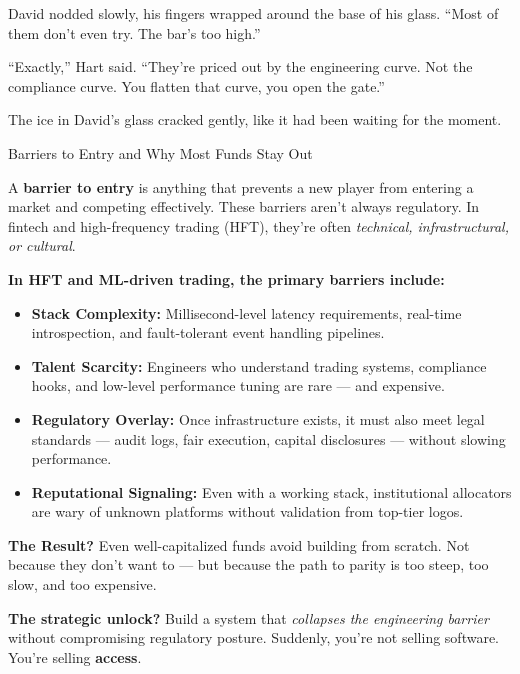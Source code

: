 David nodded slowly, his fingers wrapped around the base of his glass. “Most of them don’t even try. The bar’s too high.”

“Exactly,” Hart said. “They’re priced out by the engineering curve. Not the compliance curve. You flatten that curve, you 
open the gate.”

The ice in David’s glass cracked gently, like it had been waiting for the moment.


\medskip

\begin{TechnicalSidebar}{Barriers to Entry and Why Most Funds Stay Out}

  A \textbf{barrier to entry} is anything that prevents a new player from entering a market and competing effectively.  
  These barriers aren’t always regulatory. In fintech and high-frequency trading (HFT), they’re often 
  \textit{technical, infrastructural, or cultural}.
  
  \medskip
  
  \textbf{In HFT and ML-driven trading, the primary barriers include:}

  \medskip
  
  \begin{itemize}
    \item \textbf{Stack Complexity:}  
    Millisecond-level latency requirements, real-time introspection, and fault-tolerant event handling pipelines.
  
    \item \textbf{Talent Scarcity:}  
    Engineers who understand trading systems, compliance hooks, and low-level performance tuning are rare — and expensive.
  
    \item \textbf{Regulatory Overlay:}  
    Once infrastructure exists, it must also meet legal standards — audit logs, fair execution, capital disclosures — without slowing performance.
  
    \item \textbf{Reputational Signaling:}  
    Even with a working stack, institutional allocators are wary of unknown platforms without validation from top-tier logos.
  \end{itemize}
  
  \medskip
  
  \textbf{The Result?}  
  Even well-capitalized funds avoid building from scratch.  
  Not because they don’t want to — but because the path to parity is too steep, too slow, and too expensive.
  
  \medskip
  
  \textbf{The strategic unlock?}  
  Build a system that \textit{collapses the engineering barrier} without compromising regulatory posture.  
  Suddenly, you’re not selling software. You’re selling \textbf{access}.
  
\end{TechnicalSidebar}



